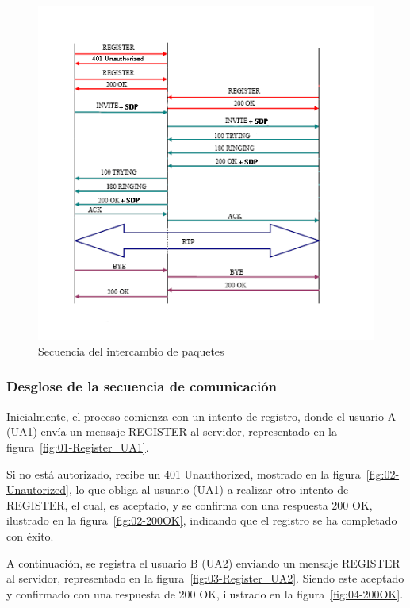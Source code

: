 \documentclass[a4paper, 12pt]{book}
\begin{document}
\begin{figure}
  \centering
  \includegraphics[width=15cm, keepaspectratio]{img/resultados/Secuencia_Paquetes.png}
  \caption{Secuencia del intercambio de paquetes}
  \label{fig:Secuencia_Paquetes}
\end{figure}

\subsubsection{Desglose de la secuencia de comunicación}
\label{subsubsec:secuencia_comunicación}

Inicialmente, el proceso comienza con un intento de registro, donde el usuario A (UA1) envía un mensaje REGISTER al servidor, 
representado en la figura~\ref{fig:01-Register_UA1}. 

\bigskip

Si no está autorizado, recibe un 401 Unauthorized, mostrado en la figura~\ref{fig:02-Unautorized}, 
lo que obliga al usuario (UA1) a realizar otro intento de REGISTER, el cual, es aceptado,
y se confirma con una respuesta 200 OK, ilustrado en la figura~\ref{fig:02-200OK}, 
indicando que el registro se ha completado con éxito.

\bigskip

A continuación, se registra el usuario B (UA2) enviando un mensaje REGISTER al servidor,
representado en la figura~\ref{fig:03-Register_UA2}. 
Siendo este aceptado y confirmado con una respuesta de 200 OK, ilustrado en la figura~\ref{fig:04-200OK}.
\end{document}
